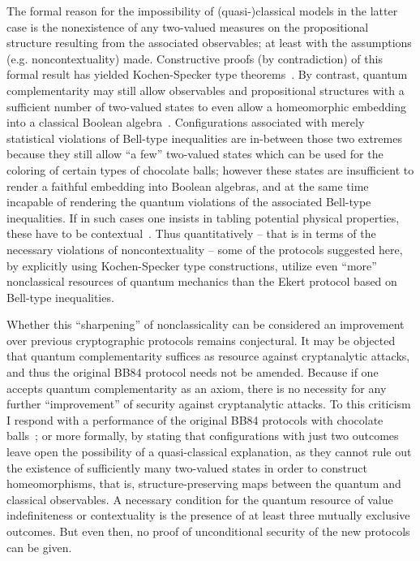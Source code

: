 \documentclass[%
 preprint,
 showpacs,
 showkeys,
 preprintnumbers,
 amsmath,amssymb,
 aps,
 pra,
  longbibliography,
 ]{revtex4-1}
\begin{document}
The formal reason for the impossibility of (quasi-)classical models in the latter case is
the nonexistence of any two-valued measures on the propositional structure resulting from the associated observables; at least with the assumptions (e.g. noncontextuality) made.
Constructive proofs (by contradiction) of this formal result has yielded
Kochen-Specker type theorems~\cite{specker-60,kochen1,ZirlSchl-65,Alda,Alda2,kamber64,kamber65,mermin-93}.
By contrast, quantum complementarity may still allow observables and propositional structures with a sufficient
number of two-valued states to even allow a homeomorphic embedding into a classical Boolean algebra~\cite{svozil-ql}.
Configurations associated with merely statistical violations of Bell-type inequalities are in-between those two extremes
because they still allow ``a few'' two-valued states
which can be used for the coloring of certain types of chocolate balls;
however these states are insufficient to render a faithful embedding into Boolean algebras,
and at the same time incapable
of rendering the quantum violations of the associated Bell-type inequalities.
If in such cases one insists in tabling potential physical properties, these have to be contextual~\cite{svozil-2011-enough}.
Thus quantitatively -- that is in terms of the necessary violations of noncontextuality -- some of the protocols suggested here,
by explicitly using Kochen-Specker type constructions, utilize even ``more'' nonclassical resources of quantum mechanics
than the Ekert protocol based on Bell-type inequalities.

Whether this ``sharpening'' of nonclassicality can be considered an improvement over previous cryptographic protocols remains conjectural.
It may be objected that quantum complementarity suffices
as resource against cryptanalytic attacks,
and thus the original BB84 protocol needs not be amended.
Because if one accepts quantum complementarity as an axiom,  there is no necessity for any further ``improvement'' of security against cryptanalytic attacks.
To this criticism I respond with a performance of the original BB84 protocols
with chocolate balls~\cite{svozil-2005-ln1e}; or more formally,
by stating that configurations with just two outcomes leave open the possibility
of a quasi-classical explanation, as they cannot rule out the existence of
sufficiently many two-valued states in order to construct homeomorphisms,
that is,  structure-preserving maps between the quantum and classical observables.
A necessary condition for the quantum resource of value indefiniteness or contextuality is the presence of at least three mutually exclusive outcomes.
But even then, no proof of unconditional security of the new protocols can be given.
\end{document}
